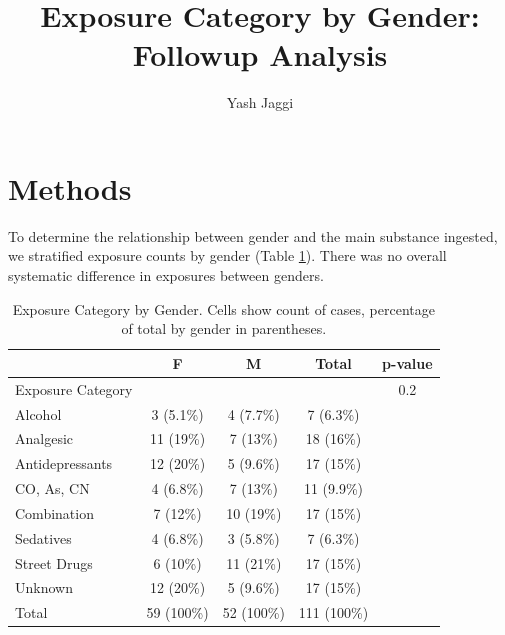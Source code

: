 \documentclass[
]{article}
\title{Exposure Category by Gender: Followup Analysis}
\author{Yash Jaggi}
\date{}
\begin{document}
\maketitle

\section*{Methods}\label{methods}

To determine the relationship between gender and the main substance ingested, we stratified exposure counts by gender (Table \ref{tab:gender_by_exposure}). There was no overall systematic difference in exposures between genders.

\begin{table}[H]\centering

\begin{tabular}{lcccc}
\toprule
 & F & M & Total & p-value\\
\midrule
Exposure Category &  &  &  & 0.2\\
Alcohol & 3 (5.1\%) & 4 (7.7\%) & 7 (6.3\%) & \\
Analgesic & 11 (19\%) & 7 (13\%) & 18 (16\%) & \\
Antidepressants & 12 (20\%) & 5 (9.6\%) & 17 (15\%) & \\
CO, As, CN & 4 (6.8\%) & 7 (13\%) & 11 (9.9\%) & \\
\addlinespace
Combination & 7 (12\%) & 10 (19\%) & 17 (15\%) & \\
Sedatives & 4 (6.8\%) & 3 (5.8\%) & 7 (6.3\%) & \\
Street Drugs & 6 (10\%) & 11 (21\%) & 17 (15\%) & \\
Unknown & 12 (20\%) & 5 (9.6\%) & 17 (15\%) & \\
Total & 59 (100\%) & 52 (100\%) & 111 (100\%) & \\
\bottomrule
\end{tabular}\caption{Exposure Category by Gender. Cells show count of cases, percentage of total by gender in parentheses.}\label{tab:gender_by_exposure}
\end{table}
\end{document}
